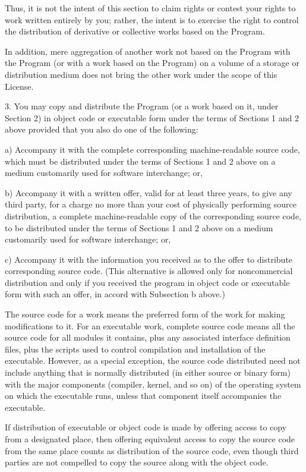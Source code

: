 \documentclass[11pt,a4paper]{article}
\begin{document}
\begin{itemize}
		Thus, it is not the intent of this section to claim rights or contest
		your rights to work written entirely by you; rather, the intent is to
		exercise the right to control the distribution of derivative or
		collective works based on the Program.

		In addition, mere aggregation of another work not based on the Program
		with the Program (or with a work based on the Program) on a volume of
		a storage or distribution medium does not bring the other work under
		the scope of this License.

		3. You may copy and distribute the Program (or a work based on it,
		under Section 2) in object code or executable form under the terms of
		Sections 1 and 2 above provided that you also do one of the following:

		a) Accompany it with the complete corresponding machine-readable
		source code, which must be distributed under the terms of Sections
		1 and 2 above on a medium customarily used for software interchange; or,

		b) Accompany it with a written offer, valid for at least three
		years, to give any third party, for a charge no more than your
		cost of physically performing source distribution, a complete
		machine-readable copy of the corresponding source code, to be
		distributed under the terms of Sections 1 and 2 above on a medium
		customarily used for software interchange; or,

		c) Accompany it with the information you received as to the offer
		to distribute corresponding source code.  (This alternative is
		allowed only for noncommercial distribution and only if you
		received the program in object code or executable form with such
		an offer, in accord with Subsection b above.)

		The source code for a work means the preferred form of the work for
		making modifications to it.  For an executable work, complete source
		code means all the source code for all modules it contains, plus any
		associated interface definition files, plus the scripts used to
		control compilation and installation of the executable.  However, as a
		special exception, the source code distributed need not include
		anything that is normally distributed (in either source or binary
		form) with the major components (compiler, kernel, and so on) of the
		operating system on which the executable runs, unless that component
		itself accompanies the executable.

		If distribution of executable or object code is made by offering
		access to copy from a designated place, then offering equivalent
		access to copy the source code from the same place counts as
		distribution of the source code, even though third parties are not
		compelled to copy the source along with the object code.


\end{itemize}
\end{document}
